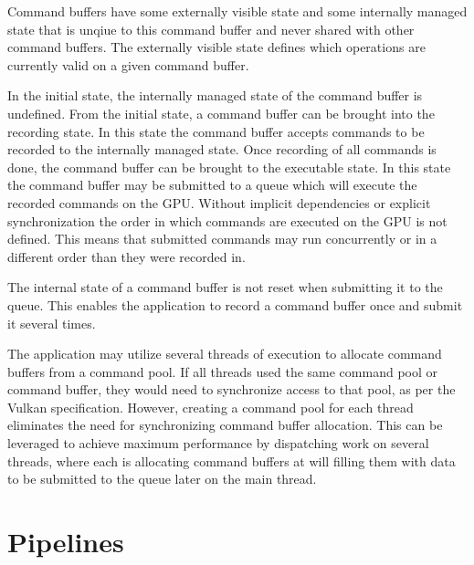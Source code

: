    Command buffers have some externally visible state and some internally managed state that is unqiue to this command buffer and never shared with other command buffers. The externally visible state defines which operations are currently valid on a given command buffer.

    In the initial state, the internally managed state of the command buffer is undefined. From the initial state, a command buffer can be brought into the recording state. In this state the command buffer accepts commands to be recorded to the internally managed state. Once recording of all commands is done, the command buffer can be brought to the executable state. In this state the command buffer may be submitted to a queue which will execute the recorded commands on the GPU. Without implicit dependencies or explicit synchronization the order in which commands are executed on the GPU is not defined. This means that submitted commands may run concurrently or in a different order than they were recorded in.

    The internal state of a command buffer is not reset when submitting it to the queue. This enables the application to record a command buffer once and submit it several times.

    The application may utilize several threads of execution to allocate command buffers from a command pool. If all threads used the same command pool or command buffer, they would need to synchronize access to that pool, as per the Vulkan specification. However, creating a command pool for each thread eliminates the need for synchronizing command buffer allocation. This can be leveraged to achieve maximum performance by dispatching work on several threads, where each is allocating command buffers at will filling them with data to be submitted to the queue later on the main thread.

  \section{Pipelines}

